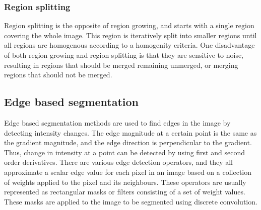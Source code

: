 \subsubsection{Region splitting}
Region splitting is the opposite of region growing, and starts with a single region covering the whole image. This region is iteratively split into smaller regions until all regions are homogenous according to a homogenity criteria. One disadvantage of both region growing and region splitting is that they are sensitive to noise, resulting in regions that should be merged remaining unmerged, or merging regions that should not be merged.

\subsection{Edge based segmentation}
Edge based segmentation methods are used to find edges in the image by detecting intensity changes. The edge magnitude at a certain point is the same as the gradient magnitude, and the edge direction is perpendicular to the gradient. Thus, change in intensity at a point can be detected by using first and second order derivatives. There are various edge detection operators, and they all approximate a scalar edge value for each pixel in an image based on a collection of weights applied to the pixel and its neighbours. These operators are usually represented as rectangular masks or filters consisting of a set of weight values. These masks are applied to the image to be segmented using discrete convolution. 

